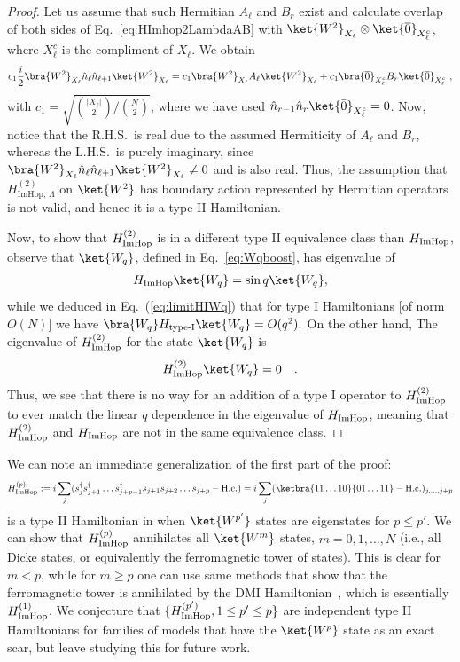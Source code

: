 \documentclass[prx,letterpaper,aps,superscriptaddress,floatfix,twocolumn,nofootinbib]{revtex4-2}
\theoremstyle{definition}
\newcommand{\ktO}{\ket{\overline{0}}}
\newcommand{\HImHopLambda}{H_{\text{ImHop},\, \Lambda}}
\begin{document}
\begin{proof}
Let us assume that such Hermitian $A_\ell$ and $B_r$ exist and calculate overlap of both sides of Eq.~\eqref{eq:HImhop2LambdaAB} with $\ket{W^2}_{X_\ell} \otimes \ktO_{X_\ell^c}$, where $X_\ell^c$ is the compliment of $X_\ell$. We obtain
\begin{equation}
c_1 \frac{i}{2}\bra{W^2}_{X_\ell}  \hat{n}_\ell \hat{n}_{\ell+1} \ket{W^2}_{X_\ell}= c_1 \bra{W^2}_{X_\ell} A_\ell\ket{W^2}_{X_\ell}+c_1 \bra{\overline{0}}_{X_\ell^c} B_r \ktO_{ X_\ell^c}  ~,
\end{equation}
with $c_1=\sqrt{\binom{|X_\ell|}{2}/\binom{N}{2}}$,
where we have used $\hat{n}_{r-1}\hat{n}_r\ket{\bar{0}}_{X_\ell^c}=0$. Now, notice that the R.H.S.\ is real due to the assumed Hermiticity of $A_\ell$ and $B_r$, whereas the L.H.S.\ is purely imaginary, since $\bra{W^2}_{X_\ell}  \hat{n}_\ell \hat{n}_{\ell+1} \ket{W^2}_{X_\ell}\neq0$ and is also real.
%
Thus, the assumption that $\HImHopLambda^{(2)}$ on $\ket{W^2}$ has boundary action represented by Hermitian operators is not valid, and hence it is a type-II Hamiltonian.
%

%
Now, to show that $H_{\rm ImHop}^{(2)}$ is in a different type II equivalence class than $H_{\rm ImHop}$, observe that $\ket{W_q}$, defined in Eq.~\eqref{eq:Wqboost}, has eigenvalue of
\begin{align}
    H_{\rm ImHop}\ket{W_q}=\sin q \ket{W_q},
\end{align}
while we deduced in Eq.~(\ref{eq:limitHIWq}) that for type I Hamiltonians [of norm $O(N)$] we have
$\bra{W_q} H_{\text{type-I}} \ket{W_q} = O(q^2).$
%
On the other hand, The eigenvalue of $H_{\rm ImHop}^{(2)}$ for the state $\ket{W_q}$ is
\begin{align}
    H_{\rm ImHop}^{(2)}\ket{W_q}=0\quad.
\end{align}
Thus, we see that there is no way for an addition of a type I operator to $H_{\rm ImHop}^{(2)}$ to ever match the linear $q$ dependence in the eigenvalue of $H_{\rm ImHop}$, meaning that $H_{\rm ImHop}^{(2)}$ and $H_{\rm ImHop}$ are not in the same equivalence class.
\end{proof}
%

%
We can note an immediate generalization of the first part of the proof:
\begin{equation}
H_{\rm ImHop}^{(p)} := i\sum_j (s_j^\dag s^\dag_{j+1} \dots s^\dag_{j+p-1} s_{j+1} s_{j+2} \dots s_{j+p} - \text{H.c.})
= i\sum_j (\ketbra{11 \dots 10}{01 \dots 11} - \text{H.c.})_{j,\dots,j+p} 
\label{eq:HImHop_p}
\end{equation}
is a type II Hamiltonian in when $\ket{W^{p'}}$ states are eigenstates for $p \leq p'$.
%
We can show that $H_{\rm ImHop}^{(p)}$ annihilates all $\ket{W^m}$ states, $m = 0, 1, \dots, N$ (i.e., all Dicke states, or equivalently the ferromagnetic tower of states).
%
This is clear for $m < p$, while for $m \geq p$ one can use same methods that show that the ferromagnetic tower is annihilated by the DMI Hamiltonian~\cite{Mark2020Eta}, which is essentially $H_{\rm ImHop}^{(1)}$.
%
We conjecture that $\{ H_{\rm ImHop}^{(p')}, 1 \leq p' \leq p\}$ are independent type II Hamiltonians for families of models that have the $\ket{W^p}$ state as an exact scar, but leave studying this for future work.
% 
\end{document}
